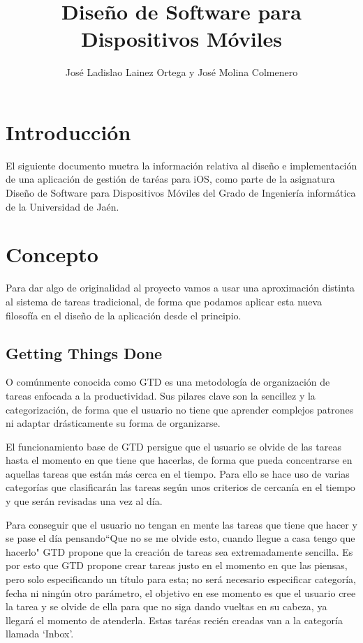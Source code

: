\documentclass[parskip=half*]{scrartcl}
\title{Dise\~no de Software para Dispositivos M\'oviles}
\author{Jos\'e Ladislao Lainez Ortega y Jos\'e Molina Colmenero}
\begin{document}

\maketitle
\tableofcontents

\newpage


\section{Introducci\'on}
El siguiente documento muetra la información relativa al diseño e implementación de una aplicación de gestión de taréas para iOS, como parte de la asignatura Diseño de Software para Dispositivos Móviles del Grado de Ingeniería informática de la Universidad de Jaén.

\section{Concepto}
Para dar algo de originalidad al proyecto vamos a usar una aproximación distinta al sistema de tareas tradicional, de forma que podamos aplicar esta nueva filosofía en el diseño de la aplicación desde el principio.

\subsection{Getting Things Done}
O comúnmente conocida como GTD es una metodología de organización de tareas enfocada a la productividad. Sus pilares clave son la sencillez y la categorización, de forma que el usuario no tiene que aprender complejos patrones ni adaptar drásticamente su forma de organizarse.

El funcionamiento base de GTD persigue que el usuario se olvide de las tareas hasta el momento en que tiene que hacerlas, de forma que pueda concentrarse en aquellas tareas que están más cerca en el tiempo. Para ello se hace uso de varias categorías que clasificarán las tareas según unos criterios de cercanía en el tiempo y que serán revisadas una vez al día.

Para conseguir que el usuario no tengan en mente las tareas que tiene que hacer y se pase el día pensando``Que no se me olvide esto, cuando llegue a casa tengo que hacerlo" GTD propone que la creación de tareas sea extremadamente sencilla. Es por esto que GTD propone crear tareas justo en el momento en que las piensas, pero solo especificando un título para esta; no será necesario especificar categoría, fecha ni ningún otro parámetro, el objetivo en ese momento es que el usuario cree la tarea y se olvide de ella para que no siga dando vueltas en su cabeza, ya llegará el momento de atenderla. Estas taréas recién creadas van a la categoría llamada `Inbox'.
\end{document}
